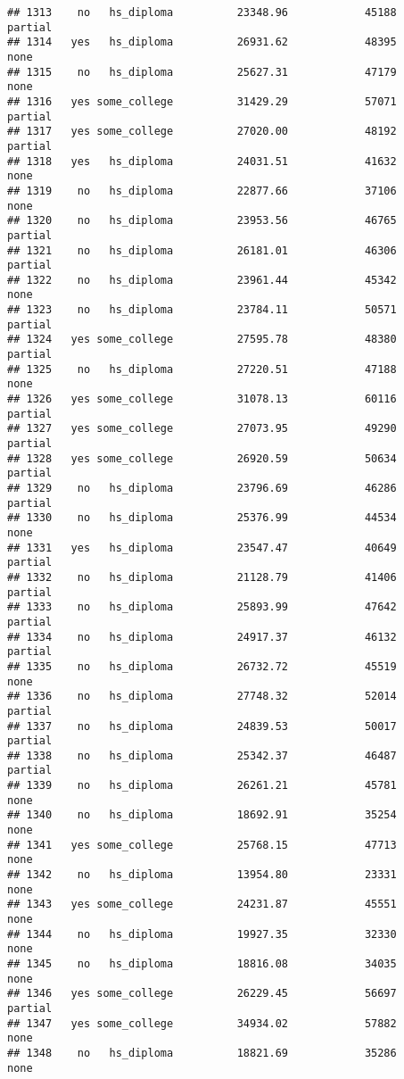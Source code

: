\documentclass[
]{article}
\begin{document}
\begin{verbatim}
## 1313    no   hs_diploma          23348.96            45188     partial
## 1314   yes   hs_diploma          26931.62            48395        none
## 1315    no   hs_diploma          25627.31            47179        none
## 1316   yes some_college          31429.29            57071     partial
## 1317   yes some_college          27020.00            48192     partial
## 1318   yes   hs_diploma          24031.51            41632        none
## 1319    no   hs_diploma          22877.66            37106        none
## 1320    no   hs_diploma          23953.56            46765     partial
## 1321    no   hs_diploma          26181.01            46306     partial
## 1322    no   hs_diploma          23961.44            45342        none
## 1323    no   hs_diploma          23784.11            50571     partial
## 1324   yes some_college          27595.78            48380     partial
## 1325    no   hs_diploma          27220.51            47188        none
## 1326   yes some_college          31078.13            60116     partial
## 1327   yes some_college          27073.95            49290     partial
## 1328   yes some_college          26920.59            50634     partial
## 1329    no   hs_diploma          23796.69            46286     partial
## 1330    no   hs_diploma          25376.99            44534        none
## 1331   yes   hs_diploma          23547.47            40649     partial
## 1332    no   hs_diploma          21128.79            41406     partial
## 1333    no   hs_diploma          25893.99            47642     partial
## 1334    no   hs_diploma          24917.37            46132     partial
## 1335    no   hs_diploma          26732.72            45519        none
## 1336    no   hs_diploma          27748.32            52014     partial
## 1337    no   hs_diploma          24839.53            50017     partial
## 1338    no   hs_diploma          25342.37            46487     partial
## 1339    no   hs_diploma          26261.21            45781        none
## 1340    no   hs_diploma          18692.91            35254        none
## 1341   yes some_college          25768.15            47713        none
## 1342    no   hs_diploma          13954.80            23331        none
## 1343   yes some_college          24231.87            45551        none
## 1344    no   hs_diploma          19927.35            32330        none
## 1345    no   hs_diploma          18816.08            34035        none
## 1346   yes some_college          26229.45            56697     partial
## 1347   yes some_college          34934.02            57882        none
## 1348    no   hs_diploma          18821.69            35286        none

\end{verbatim}
\end{document}
